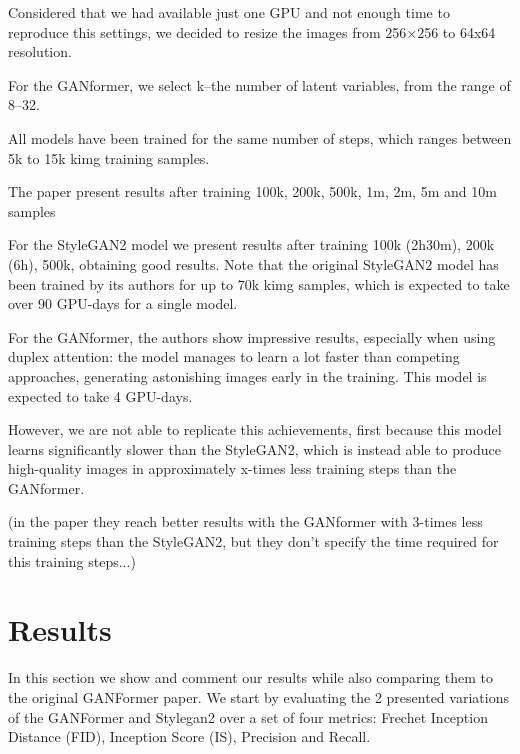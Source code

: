 \documentclass{article}
\begin{document}
	Considered that we had available just one GPU and not enough time to reproduce this settings, we 
	decided to resize the images from 256×256 to 64x64 resolution.
	
	
	For the GANformer, we select k–the number of latent variables, from the range of 8–32. 
	
	All models have been trained for the same number of steps, which ranges between 5k to 15k kimg 
	training samples. 
	
	The paper present results after training 100k, 200k, 500k, 1m, 2m, 5m and 10m samples
	
	For the StyleGAN2 model we present results after training 100k (2h30m), 200k (6h), 500k, obtaining 
	good results.
	Note that the original StyleGAN2 model has been trained by its authors \cite{karras2020analyzing} 
	for up to 70k kimg samples, which is expected to take over 90 GPU-days for a single model. 
	

	For the GANformer, the authors \cite{karras2020analyzing} show impressive results, especially when 
	using duplex attention: the model manages to learn a lot faster than competing approaches, 
	generating astonishing images early in the training. This model is expected to take 4 GPU-days.
	
	However, we are not able to replicate this achievements, first because this model learns significantly 
	slower than the StyleGAN2, which is instead able to produce high-quality images in approximately 
	x-times less training steps than the GANformer.
	
	(in the paper they reach better results with the GANformer with 3-times less training steps than the 
	StyleGAN2, but they don't specify the time required for this training steps...)

	\section{Results}%
	In this section we show and comment our results while also comparing them to the original GANFormer paper.
	We start by evaluating the 2 presented variations of the GANFormer and Stylegan2 over a set of 
	four metrics: Frechet Inception Distance (FID), Inception Score (IS), Precision and Recall.
	
\end{document}
